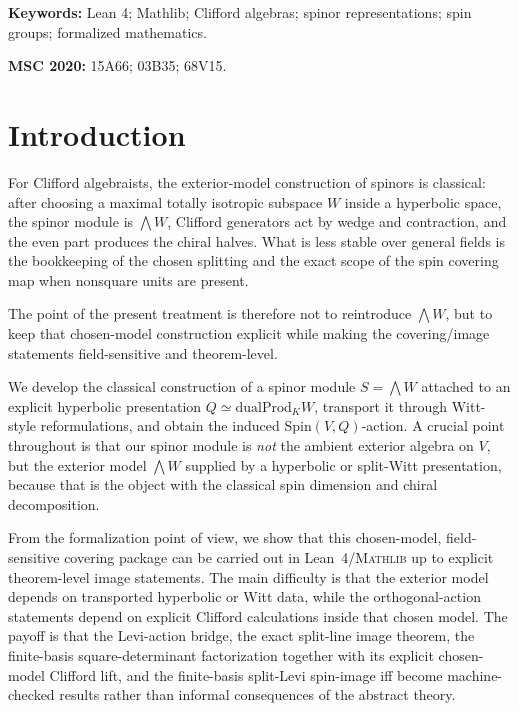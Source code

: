 \documentclass[11pt,a4paper]{article}
\theoremstyle{plain}
\theoremstyle{definition}
\theoremstyle{remark}
\newcommand{\Spin}{\mathrm{Spin}}
\newcommand{\dualProd}{\mathrm{dualProd}}
\newcommand{\Lean}{Lean~4\xspace}
\newcommand{\Mathlib}{\textsc{Mathlib}\xspace}
\begin{document}
\noindent\textbf{Keywords:} Lean 4; Mathlib; Clifford algebras; spinor
representations; spin groups; formalized mathematics.

\noindent\textbf{MSC 2020:} 15A66; 03B35; 68V15.

\section{Introduction}
\label{sec:intro}

For Clifford algebraists, the exterior-model construction of spinors is
classical: after choosing a maximal totally isotropic subspace $W$ inside a
hyperbolic space, the spinor module is $\bigwedge W$, Clifford generators act
by wedge and contraction, and the even part produces the chiral halves. What is
less stable over general fields is the bookkeeping of the chosen splitting and
the exact scope of the spin covering map when nonsquare units are present.

The point of the present treatment is therefore not to reintroduce
$\bigwedge W$, but to keep that chosen-model construction explicit while making
the covering/image statements field-sensitive and theorem-level.

We develop the classical construction of a spinor
module $S=\bigwedge W$ attached to an explicit hyperbolic presentation
$Q \simeq \dualProd_K W$, transport it through Witt-style reformulations, and
obtain the induced $\Spin(V,Q)$-action. A crucial point throughout is that our
spinor module is \emph{not} the ambient exterior algebra on $V$, but
the exterior model $\bigwedge W$ supplied by a hyperbolic or split-Witt
presentation, because that is the object with the classical spin dimension and
chiral decomposition.

From the formalization point of view, we show that this chosen-model,
field-sensitive covering package can be carried out in \Lean/\Mathlib up to
explicit theorem-level image statements. The main
difficulty is that the exterior model depends on transported hyperbolic or Witt
data, while the orthogonal-action statements depend on explicit Clifford
calculations inside that chosen model. The payoff is that the Levi-action
bridge, the exact split-line image theorem, the finite-basis square-determinant
factorization together with its explicit chosen-model Clifford lift, and the
finite-basis split-Levi spin-image iff become machine-checked results rather
than informal consequences of the abstract theory.
\end{document}
